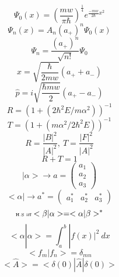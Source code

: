 \documentclass[10pt]{article}
\begin{document}
\begin{multicols}{3}
\begin{equation*}
\Psi_0(x)=\left(\frac{mw}{\pi \hbar}\right)^{\frac{1}{4}}e^{\frac{-mw}{2\hbar}x^2}
\end{equation*}
\begin{equation*}
\Psi_n(x)=A_n(a_+)^n\Psi_0(x)
\end{equation*}
\begin{equation*}
\Psi_n=\frac{(a_+)^n}{\sqrt{n!}}\Psi_0
\end{equation*}
\begin{equation*}
x=\sqrt{\frac{\hbar}{2mw}}(a_++a_-)
\end{equation*}
\begin{equation*}
\hat{p}=i\sqrt{\frac{\hbar mw}{2}}(a_+-a_-)
\end{equation*}
\begin{equation*}
R=(1+(2\hbar^2E/m\alpha^2))^{-1}
\end{equation*}
\begin{equation*}
T=(1+(m\alpha^2/2\hbar^2E))^{-1}
\end{equation*}
\begin{equation*}
R=\frac{|B|^2}{|A|^2} ,\ T=\frac{|F|^2}{|A|^2}
\end{equation*}
\begin{equation*}
R+T=1
\end{equation*}
\begin{equation*}
|\alpha> \rightarrow a=
\begin{pmatrix}
a_1 \\ a_2 \\ a_3
\end{pmatrix}
\end{equation*}
\begin{equation*}
<\alpha| \rightarrow a^{*}=
\begin{pmatrix}
a_{1}^{*} & a_{2}^{*} & a_{3}^{*}
\end{pmatrix}
\end{equation*}
\begin{equation*}
\text{\tiny H.S iff} <\beta|\alpha>=<\alpha|\beta>^{*}
\end{equation*}
\begin{equation*}
<\alpha|\alpha>=\int_{a}^{b}|f(x)|^2 \ dx
\end{equation*}
\begin{equation*}
<f_m|f_n>=\delta_{mn}
\end{equation*}
\begin{equation*}
<\hat{A}>=<\delta(0)|\hat{A}|\delta(0)>
\end{equation*}

\end{multicols}
\end{document}
